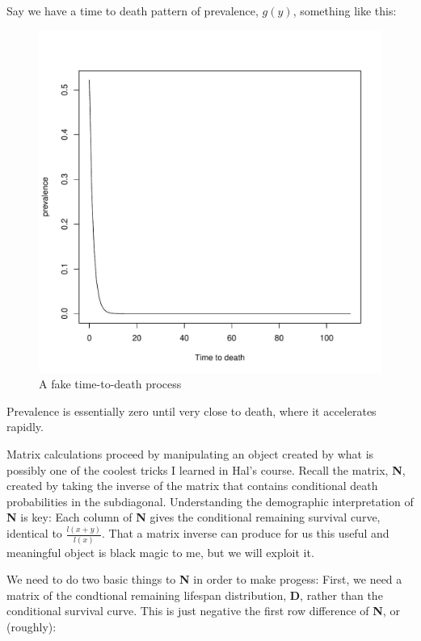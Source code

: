 \documentclass[11pt,oneside,a4paper]{article} %
\begin{document}
 Say we have a time to death pattern of prevalence, $g(y)$, something like this:
 \begin{figure}
	\centering
	\includegraphics[scale=.7]{Figures/gyTim.pdf}
	\caption{A fake time-to-death process}
	\label{fig:gy}
\end{figure}
Prevalence is essentially zero until very close to death, where it accelerates
rapidly. 

Matrix calculations proceed by manipulating an object created by what is
possibly one of the coolest tricks I learned in Hal's course. Recall the matrix,
\textbf{N}, created by taking the inverse of the matrix that contains
conditional death probabilities in the subdiagonal. Understanding the
demographic interpretation of \textbf{N} is key: Each column of \textbf{N} gives
the conditional remaining survival curve, identical to $\frac{l(x+y)}{l(x)}$.
That a matrix inverse can produce for us this useful and meaningful object is black
magic to me, but we will exploit it.

We need to do two basic things to \textbf{N} in order to make progess: First, we
need a matrix of the condtional remaining lifespan distribution, \textbf{D},
rather than the conditional survival curve. This is just negative the first row difference of \textbf{N},
or (roughly):
\end{document}
